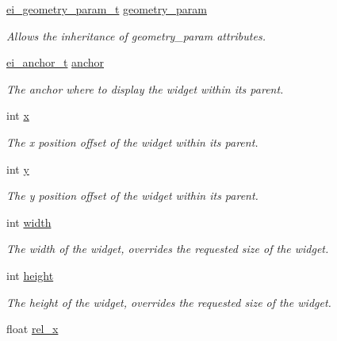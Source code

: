 \begin{DoxyCompactItemize}
\item 
\hyperlink{structei__geometry__param__t}{ei\+\_\+geometry\+\_\+param\+\_\+t} \hyperlink{structei__placer__geometry__param__t_ac4fbf1c623a149e51297d6bad1550ff2}{geometry\+\_\+param}
\begin{DoxyCompactList}\small\item\em Allows the inheritance of geometry\+\_\+param attributes. \end{DoxyCompactList}\item 
\hyperlink{ei__types_8h_a3852c963af609d31d7cfcff79c4c8450}{ei\+\_\+anchor\+\_\+t} \hyperlink{structei__placer__geometry__param__t_a6c2d76c5f9b80d1dedd8357def0d58c7}{anchor}
\begin{DoxyCompactList}\small\item\em The anchor where to display the widget within its parent. \end{DoxyCompactList}\item 
int \hyperlink{structei__placer__geometry__param__t_a49274771b617cde0726439ed5df76a19}{x}
\begin{DoxyCompactList}\small\item\em The x position offset of the widget within its parent. \end{DoxyCompactList}\item 
int \hyperlink{structei__placer__geometry__param__t_abe452e637888cc79b260cf5f6eab5f70}{y}
\begin{DoxyCompactList}\small\item\em The y position offset of the widget within its parent. \end{DoxyCompactList}\item 
int \hyperlink{structei__placer__geometry__param__t_a65101b00a7bb329e4607381014dcfcfb}{width}
\begin{DoxyCompactList}\small\item\em The width of the widget, overrides the requested size of the widget. \end{DoxyCompactList}\item 
int \hyperlink{structei__placer__geometry__param__t_a618ac597262e097151de37f8388e2b67}{height}
\begin{DoxyCompactList}\small\item\em The height of the widget, overrides the requested size of the widget. \end{DoxyCompactList}\item 
float \hyperlink{structei__placer__geometry__param__t_a7ef1944c9e941e32ecc97b06d93ccde2}{rel\+\_\+x}

\end{DoxyCompactItemize}
